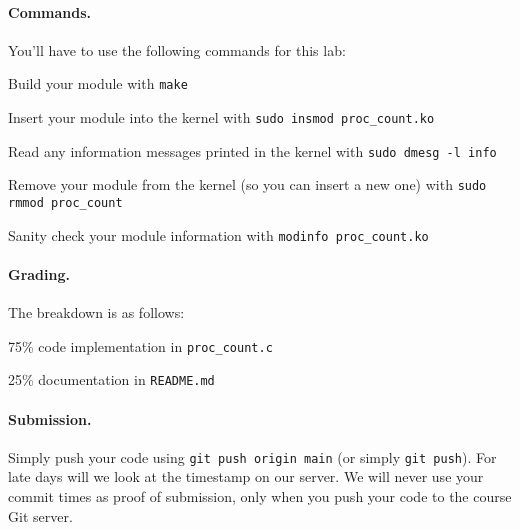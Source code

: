 \paragraph{Commands.}

You'll have to use the following commands for this lab:

Build your module with \lstinline|make|

Insert your module into the kernel with \lstinline|sudo insmod proc_count.ko|

Read any information messages printed in the kernel with
\lstinline|sudo dmesg -l info|

Remove your module from the kernel (so you can insert a new one) with
\lstinline|sudo rmmod proc_count|

Sanity check your module information with \lstinline|modinfo proc_count.ko|

\paragraph{Grading.}

The breakdown is as follows:

75\% \hspace{0.5em} code implementation in \lstinline|proc_count.c|

25\% \hspace{0.5em} documentation in \lstinline|README.md|

\paragraph{Submission.}

Simply push your code using \lstinline|git push origin main| (or simply
\lstinline|git push|).
For late days will we look at the timestamp on our server.
We will never use your commit times as proof of submission, only when you
push your code to the course Git server.


